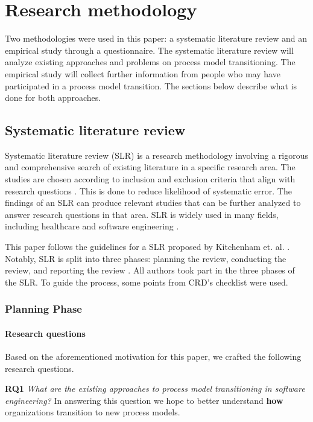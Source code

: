 \documentclass[conference]{IEEEtran}
\begin{document}
\section{Research methodology}
Two methodologies were used in this paper: a systematic literature review and an empirical study through a questionnaire. The systematic literature review will analyze existing approaches and problems on process model transitioning. The empirical study will collect further information from people who may have participated in a process model transition. The sections below describe what is done for both approaches.


\subsection{Systematic literature review}
Systematic literature review (SLR) is a research methodology involving a rigorous and comprehensive search of existing literature in a specific research area. The studies are chosen according to inclusion and exclusion criteria that align with research questions \cite{KHAN2017180, kitchenham}. This is done to reduce likelihood of systematic error. The findings of an SLR can produce relevant studies that can be further analyzed to answer research questions in that area. SLR is widely used in many fields, including healthcare and software engineering \cite{kitchenham}.

This paper follows the guidelines for a SLR proposed by Kitchenham et. al. \cite{kitchenham}. Notably, SLR is split into three phases: planning the review, conducting the review, and reporting the review \cite{kitchenham}. All authors took part in the three phases of the SLR. To guide the process, some points from CRD's \cite{university2001undertaking} checklist were used.

\subsubsection{Planning Phase}

\paragraph{Research questions}
Based on the aforementioned motivation for this paper, we crafted the following research questions.

\textbf{RQ1} \textit{What are the existing approaches to process model transitioning in software engineering?} In answering this question we hope to better understand \textbf{how} organizations transition to new process models.
\end{document}
